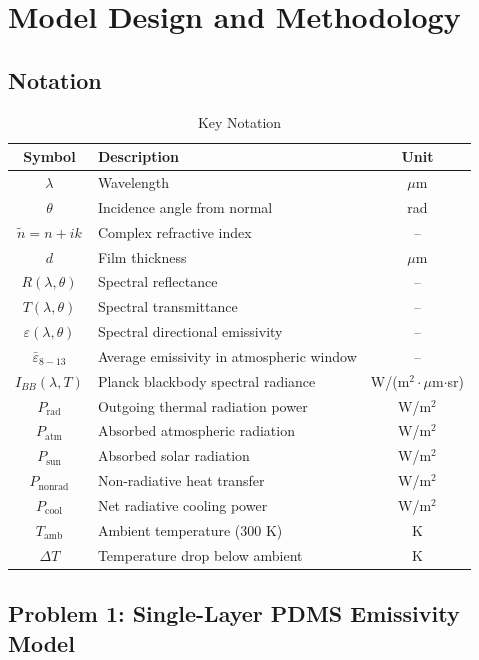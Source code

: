 \section{Model Design and Methodology}

\subsection{Notation}

\begin{table}[htbp]
  \centering
  \caption{Key Notation}
  \begin{tabular}{c|l|c}
    \toprule
    \textbf{Symbol} & \textbf{Description} & \textbf{Unit} \\
    \midrule
    $\lambda$ & Wavelength & $\mu$m \\
    $\theta$ & Incidence angle from normal & rad \\
    $\tilde{n} = n + ik$ & Complex refractive index & -- \\
    $d$ & Film thickness & $\mu$m \\
    $R(\lambda,\theta)$ & Spectral reflectance & -- \\
    $T(\lambda,\theta)$ & Spectral transmittance & -- \\
    $\varepsilon(\lambda,\theta)$ & Spectral directional emissivity & -- \\
    $\bar{\varepsilon}_{8-13}$ & Average emissivity in atmospheric window & -- \\
    $I_{BB}(\lambda,T)$ & Planck blackbody spectral radiance & W/(m$^2\cdot\mu$m$\cdot$sr) \\
    $P_{\text{rad}}$ & Outgoing thermal radiation power & W/m$^2$ \\
    $P_{\text{atm}}$ & Absorbed atmospheric radiation & W/m$^2$ \\
    $P_{\text{sun}}$ & Absorbed solar radiation & W/m$^2$ \\
    $P_{\text{nonrad}}$ & Non-radiative heat transfer & W/m$^2$ \\
    $P_{\text{cool}}$ & Net radiative cooling power & W/m$^2$ \\
    $T_{\text{amb}}$ & Ambient temperature (300 K) & K \\
    $\Delta T$ & Temperature drop below ambient & K \\
    \bottomrule
  \end{tabular}
\end{table}

\subsection{Problem 1: Single-Layer PDMS Emissivity Model}

